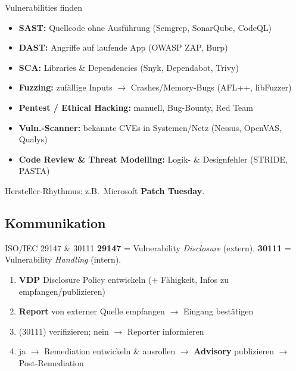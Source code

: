 \documentclass[a4paper, fontsize=7pt]{scrartcl}
\begin{document}
\begin{mainbox}{Vulnerabilities finden}
\begin{itemize}
    \item \textbf{SAST:} Quellcode ohne Ausführung (Semgrep, SonarQube,
          CodeQL)
    \item \textbf{DAST:} Angriffe auf laufende App (OWASP ZAP, Burp)
    \item \textbf{SCA:} Libraries \& Dependencies (Snyk, Dependabot,
          Trivy)
    \item \textbf{Fuzzing:} zufällige Inputs $\to$ Crashes/Memory-Bugs
          (AFL++, libFuzzer)
    \item \textbf{Pentest / Ethical Hacking:} manuell, Bug-Bounty, Red
          Team
    \item \textbf{Vuln.-Scanner:} bekannte CVEs in Systemen/Netz (Nessus,
          OpenVAS, Qualys)
    \item \textbf{Code Review \& Threat Modelling:} Logik- \&
          Designfehler (STRIDE, PASTA)
\end{itemize}
Hersteller-Rhythmus: z.B.\ Microsoft \textbf{Patch Tuesday}.
\end{mainbox}

\subsection{Kommunikation}

\begin{mainbox}{ISO/IEC 29147 \& 30111}
\textbf{29147} = Vulnerability \emph{Disclosure} (extern),
\textbf{30111} = Vulnerability \emph{Handling} (intern).
\begin{enumerate}
    \item \textbf{VDP} Disclosure Policy entwickeln (+ Fähigkeit,
          Infos zu empfangen/publizieren)
    \item \textbf{Report} von externer Quelle empfangen
          $\to$ Eingang bestätigen
    \item (30111) verifizieren; nein $\to$ Reporter informieren
    \item ja $\to$ Remediation entwickeln \& ausrollen $\to$
          \textbf{Advisory} publizieren $\to$ Post-Remediation
\end{enumerate}
\end{mainbox}
\end{document}
